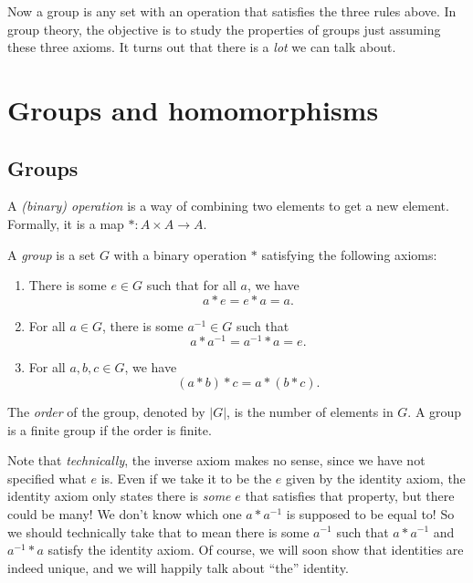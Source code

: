 \documentclass[a4paper]{article}
\begin{document}
Now a group is any set with an operation that satisfies the three rules above. In group theory, the objective is to study the properties of groups just assuming these three axioms. It turns out that there is a \emph{lot} we can talk about.

\section{Groups and homomorphisms}
\subsection{Groups}
\begin{defi}
  A \emph{(binary) operation} is a way of combining two elements to get a new element. Formally, it is a map $*: A \times A \rightarrow A$.
\end{defi}
\begin{defi}[Group]
  A \emph{group} is a set $G$ with a binary operation $*$ satisfying the following axioms:
  \begin{enumerate}[label=\arabic{*}.]
    \item There is some $e \in G$ such that for all $a$, we have
      \[
        a*e = e*a = a.\tag{identity}
      \]
    \item For all $a \in G$, there is some $a^{-1} \in G$ such that
      \[
        a*a^{-1} = a^{-1}*a = e.\tag{inverse}
      \]
    \item For all $a, b, c\in G$, we have
      \[
        (a*b)*c = a*(b*c).\tag{associativity}
      \]
  \end{enumerate}
\end{defi}

\begin{defi}
  The \emph{order} of the group, denoted by $|G|$, is the number of elements in $G$. A group is a finite group if the order is finite.
\end{defi}

Note that \emph{technically}, the inverse axiom makes no sense, since we have not specified what $e$ is. Even if we take it to be the $e$ given by the identity axiom, the identity axiom only states there is \emph{some} $e$ that satisfies that property, but there could be many! We don't know which one $a * a^{-1}$ is supposed to be equal to! So we should technically take that to mean there is some $a^{-1}$ such that $a*a^{-1}$ and $a^{-1} * a$ satisfy the identity axiom. Of course, we will soon show that identities are indeed unique, and we will happily talk about ``the'' identity.
\end{document}
